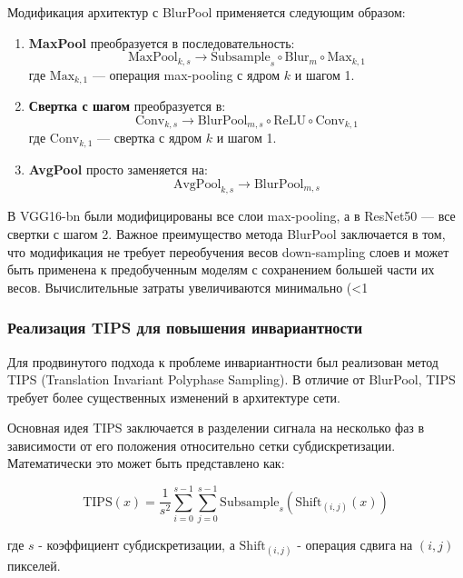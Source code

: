 Модификация архитектур с BlurPool применяется следующим образом:

\begin{enumerate}
    \item \textbf{MaxPool} преобразуется в последовательность:
    $$\text{MaxPool}_{k,s} \to \text{Subsample}_{s} \circ \text{Blur}_{m} \circ \text{Max}_{k,1}$$
    где $\text{Max}_{k,1}$ — операция max-pooling с ядром $k$ и шагом 1.
    
    \item \textbf{Свертка с шагом} преобразуется в:
    $$\text{Conv}_{k,s} \to \text{BlurPool}_{m,s} \circ \text{ReLU} \circ \text{Conv}_{k,1}$$
    где $\text{Conv}_{k,1}$ — свертка с ядром $k$ и шагом 1.
    
    \item \textbf{AvgPool} просто заменяется на:
    $$\text{AvgPool}_{k,s} \to \text{BlurPool}_{m,s}$$
\end{enumerate}

В VGG16-bn были модифицированы все слои max-pooling, а в ResNet50 — все свертки с шагом 2. Важное преимущество метода BlurPool заключается в том, что модификация не требует переобучения весов down-sampling слоев и может быть применена к предобученным моделям с сохранением большей части их весов. Вычислительные затраты увеличиваются минимально (<1%

\subsubsection{Реализация TIPS для повышения инвариантности}
\label{sec:architectures:tips}

Для продвинутого подхода к проблеме инвариантности был реализован метод TIPS (Translation Invariant Polyphase Sampling). В отличие от BlurPool, TIPS требует более существенных изменений в архитектуре сети.

Основная идея TIPS заключается в разделении сигнала на несколько фаз в зависимости от его положения относительно сетки субдискретизации. Математически это может быть представлено как:

\begin{equation}
\text{TIPS}(x) = \frac{1}{s^2}\sum_{i=0}^{s-1}\sum_{j=0}^{s-1} \text{Subsample}_{s}(\text{Shift}_{(i,j)}(x))
\end{equation}

где $s$ - коэффициент субдискретизации, а $\text{Shift}_{(i,j)}$ - операция сдвига на $(i,j)$ пикселей.

